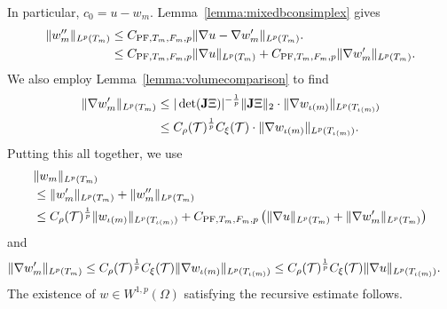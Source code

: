 \documentclass[10pt,a4paper]{article}
\begin{document}
    In particular, $c_{0} = u - w_{m}$. 
    Lemma~\ref{lemma:mixedbconsimplex} gives 
    \begin{align*}
        \| w''_{m} \|_{L^{p}(T_{m})} 
        &
        \leq 
        C_{{\rm PF},T_{m},F_{m},p} \| \nabla u - \nabla w'_{m} \|_{L^{p}(T_{m})}.
        \\&
        \leq 
        C_{{\rm PF},T_{m},F_{m},p} \| \nabla u      \|_{L^{p}(T_{m})} 
        + 
        C_{{\rm PF},T_{m},F_{m},p} \| \nabla w'_{m} \|_{L^{p}(T_{m})} 
        .
    \end{align*}
    We also employ Lemma~\ref{lemma:volumecomparison} to find 
    \begin{align*}
        \| \nabla w'_{m} \|_{L^{p}(T_{m})}
        &
        \leq 
        |\det({\mathbf{J}} \Xi  )|^{-\frac 1 p} 
        \|  {\mathbf{J}} \Xi    \|_{2}
        \cdot 
        \| \nabla w_{\iota(m)} \|_{L^{p}(T_{\iota(m)})}
        \\&
        \leq 
        C_\rho({\mathcal T})^{\frac 1 p} C_\xi({\mathcal T})
        \cdot 
        \| \nabla w_{\iota(m)} \|_{L^{p}(T_{\iota(m)})}
        .
    \end{align*}
    Putting this all together, we use 
    \begin{align*}
        &
        \| w_{m} \|_{L^{p}(T_{m})}
        \\&
        \leq  
        \| w'_{m} \|_{L^{p}(T_{m})}
        + 
        \| w''_{m} \|_{L^{p}(T_{m})}
        \\&
        \leq  
        C_\rho({\mathcal T})^{\frac 1 p} 
        \| w_{\iota(m)} \|_{L^{p}(T_{\iota(m)})} 
        + 
        C_{{\rm PF},T_{m},F_{m},p} 
        \left( 
            \| \nabla u \|_{L^{p}(T_{m})} 
            + 
            \| \nabla w'_{m} \|_{L^{p}(T_{m})} 
        \right) 
    \end{align*}
    and 
    \begin{align*}
        \| \nabla w'_{m} \|_{L^{p}(T_{m})} 
        &
        \leq  
        C_\rho({\mathcal T})^{\frac 1 p} C_\xi({\mathcal T})
        \| \nabla w_{\iota(m)} \|_{L^{p}(T_{\iota(m)})} 
        \leq  
        C_\rho({\mathcal T})^{\frac 1 p} C_\xi({\mathcal T})
        \| \nabla u \|_{L^{p}(T_{\iota(m)})} 
        .
    \end{align*}
    The existence of $w \in W^{1,p}(\Omega)$ satisfying the recursive estimate follows. 
\end{document}
